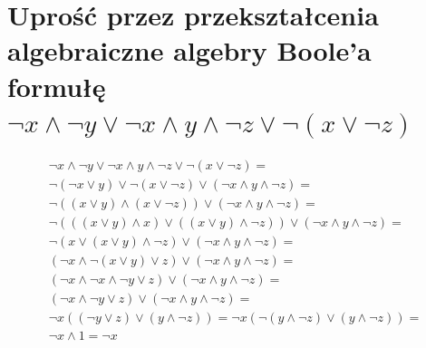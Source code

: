 \documentclass{article}
\begin{document}
\section{Uprość przez przekształcenia algebraiczne algebry Boole’a formułę $\neg x \wedge \neg y \vee \neg x \wedge y \wedge \neg z \vee \neg (x \vee \neg z)$}
\begin{gather*}
\neg x \wedge \neg y \vee \neg x \wedge y \wedge \neg z \vee \neg (x \vee \neg z) = \\ 
 \neg (\neg x \vee y) \vee \neg (x \vee \neg z) \vee (\neg x \wedge y \wedge \neg z) = \\ 
\neg (( x \vee y) \wedge (x \vee \neg z)) \vee (\neg x \wedge y \wedge \neg z) = \\ 
\neg (((x \vee y) \wedge x) \vee ((x \vee y) \wedge \neg z)) \vee (\neg x \wedge y \wedge \neg z) = \\
\neg (x \vee (x \vee y) \wedge \neg z) \vee (\neg x \wedge y \wedge \neg z) = \\
(\neg x \wedge \neg (x \vee y) \vee z) \vee (\neg x \wedge y \wedge \neg z) = \\
(\neg x \wedge \neg x \wedge \neg y \vee z) \vee (\neg x \wedge y \wedge \neg z) = \\
 (\neg x \wedge \neg y \vee z) \vee (\neg x \wedge y \wedge \neg z) = \\ 
 \neg x((\neg y \vee z) \vee (y \wedge \neg z)) =   \neg x(\neg(y \wedge \neg z) \vee (y \wedge \neg z)) =\\ \neg x \wedge 1 = \neg x
\end{gather*}
\end{document}
